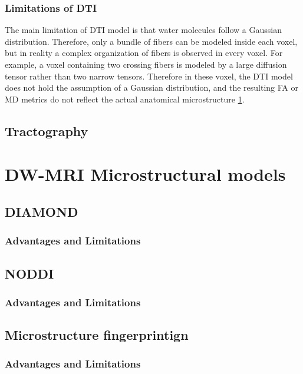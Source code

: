   \subsubsection*{Limitations of DTI}
  The main limitation of DTI model is that water molecules follow a Gaussian distribution. Therefore, only a bundle of fibers can be modeled inside each voxel, but in reality a complex organization of fibers is observed in every voxel. For example, a voxel containing two crossing fibers is modeled by a large diffusion tensor rather than two narrow tensors. Therefore in these voxel, the DTI model does not hold the assumption of a Gaussian distribution, and the resulting FA or MD metrics do not reflect the actual anatomical microstructure \ref{fig:fiber_crossing}.

  \begin{figure}[h]
      \centering
      \caption{}
      \label{fig:fiber_crossing}
  \end{figure}
 \subsection{Tractography}

\section{DW-MRI Microstructural models}
 \subsection{DIAMOND}
  \subsubsection*{Advantages and Limitations}
 \subsection{NODDI}
  \subsubsection*{Advantages and Limitations}
 \subsection{Microstructure fingerprintign}
  \subsubsection*{Advantages and Limitations}
